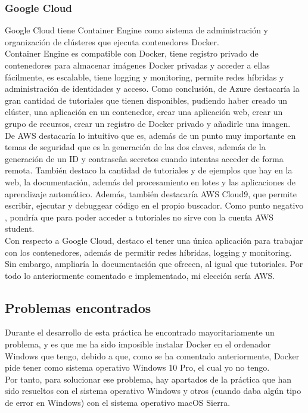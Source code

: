 \documentclass[english,runningheads,a4paper]{llncs}[2018/03/10]
\begin{document}
\subsubsection*{Google Cloud}
Google Cloud tiene Container Engine como sistema de administración y 
organización de clústeres que ejecuta contenedores Docker. \\
Container Engine es compatible con Docker, tiene registro privado de 
contenedores para almacenar imágenes Docker privadas y acceder a ellas 
fácilmente, es escalable, tiene logging y monitoring, permite redes híbridas y 
administración de identidades y acceso.
\newline
Como conclusión, de Azure destacaría la gran cantidad de tutoriales que tienen 
disponibles, pudiendo haber creado un clúster, una aplicación en un contenedor, 
crear una aplicación web, crear un grupo de recursos, crear un registro de 
Docker privado y añadirle una imagen. \\ 
De AWS destacaría lo intuitivo que es, además de un punto muy importante en 
temas de seguridad que es la generación de las dos claves, además de la 
generación de un ID y contraseña secretos cuando intentas acceder de forma 
remota. También destaco la cantidad de tutoriales y de ejemplos que hay en la 
web, la documentación, además del procesamiento en lotes y las aplicaciones de 
aprendizaje automático. Además, también destacaría AWS Cloud9, que permite 
escribir, ejecutar y debuggear código en el propio buscador. Como punto negativo
, pondría que para poder acceder a tutoriales no sirve con la cuenta AWS 
student. \\
Con respecto a Google Cloud, destaco el tener una única aplicación para trabajar
con los contenedores, además de permitir redes híbridas, logging y monitoring. 
Sin embargo, ampliaría la documentación que ofrecen, al igual que tutoriales. 
\newline
Por todo lo anteriormente comentado e implementado, mi elección sería AWS.

\newpage
\subsection*{Problemas encontrados}
Durante el desarrollo de esta práctica he encontrado mayoritariamente un 
problema, y es que me ha sido imposible instalar Docker en el ordenador Windows 
que tengo, debido a que, como se ha comentado anteriormente, Docker pide tener 
como sistema operativo Windows 10 Pro, el cual yo no tengo. \\
Por tanto, para solucionar ese problema, hay apartados de la práctica que han 
sido resueltos con el sistema operativo Windows y otros (cuando daba algún tipo 
de error en Windows) con el sistema operativo macOS Sierra.
\end{document}
